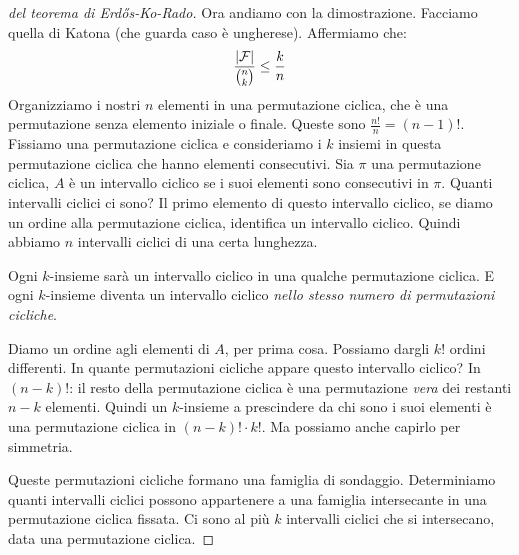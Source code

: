 \begin{proof}[del teorema di Erd\H{o}s-Ko-Rado]
			Ora andiamo con la dimostrazione.
			Facciamo quella di Katona (che guarda caso \`e ungherese).
			Affermiamo che:
			\[
				\frac{\left\lvert{\mathcal{F}}\right\rvert}{\binom{n}{k}} \le \frac{k}{n}
			\]
			Organizziamo i nostri $n$ elementi in una permutazione ciclica, che \`e una permutazione senza elemento iniziale o finale.
			Queste sono $\frac{n!}{n} = (n-1)!$.
			Fissiamo una permutazione ciclica e consideriamo i $k$ insiemi in questa permutazione ciclica che hanno elementi consecutivi.
			Sia $\pi$ una permutazione ciclica, $A$ \`e un intervallo ciclico se i suoi elementi sono consecutivi in $\pi$.
			Quanti intervalli ciclici ci sono?
			Il primo elemento di questo intervallo ciclico, se diamo un ordine alla permutazione ciclica, identifica un intervallo ciclico.
			Quindi abbiamo $n$ intervalli ciclici di una certa lunghezza.

			Ogni $k$-insieme sar\`a un intervallo ciclico in una qualche permutazione ciclica.
			E ogni $k$-insieme diventa un intervallo ciclico \emph{nello stesso numero di permutazioni cicliche}.

			Diamo un ordine agli elementi di $A$, per prima cosa.
			Possiamo dargli $k!$ ordini differenti.
			In quante permutazioni cicliche appare questo intervallo ciclico?
			In $(n - k)!$: il resto della permutazione ciclica \`e una permutazione \emph{vera} dei restanti $n - k$ elementi.
			Quindi un $k$-insieme a prescindere da chi sono i suoi elementi \`e una permutazione ciclica in $(n-k)! \cdot k!$.
			Ma possiamo anche capirlo per simmetria.

			Queste permutazioni cicliche formano una famiglia di sondaggio.
			Determiniamo quanti intervalli ciclici possono appartenere a una famiglia intersecante in una permutazione ciclica fissata.
			Ci sono al pi\`u $k$ intervalli ciclici che si intersecano, data una permutazione ciclica.
		\end{proof}






